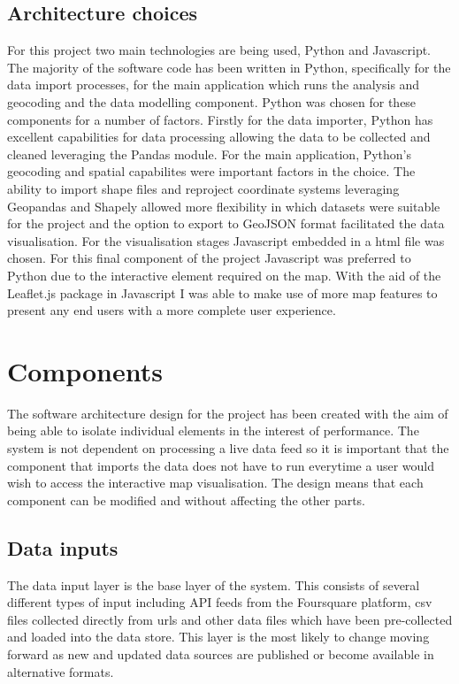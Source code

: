 \subsection{Architecture choices}
For this project two main technologies are being used, Python and Javascript. The majority of the software code has been written in Python, specifically for the data import processes, for the main application which runs the analysis and geocoding and the data modelling component. Python was chosen for these components for a number of factors. Firstly for the data importer, Python has excellent capabilities for data processing allowing the data to be collected and cleaned leveraging the Pandas module. For the main application, Python's geocoding and spatial capabilites were important factors in the choice. The ability to import shape files and reproject coordinate systems leveraging Geopandas and Shapely allowed more flexibility in which datasets were suitable for the project and the option to export to GeoJSON format facilitated the data visualisation.
For the visualisation stages Javascript embedded in a html file was chosen. For this final component of the project Javascript was preferred to Python due to the interactive element required on the map. With the aid of the Leaflet.js package in Javascript I was able to make use of more map features to present any end users with a more complete user experience.



\section{Components}

The software architecture design for the project has been created with the aim of being able to isolate individual elements in the interest of performance. The system is not dependent on processing a live data feed so it is important that the component that imports the data does not have to run everytime a user would wish to access the interactive map visualisation. The design means that each component can be modified and without affecting the other parts.  


\subsection{Data inputs}
The data input layer is the base layer of the system. This consists of several different types of input including API feeds from the Foursquare platform, csv files collected directly from urls and other data files which have been pre-collected and loaded into the data store. This layer is the most likely to change moving forward as new and updated data sources are published or become available in alternative formats.

